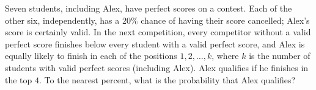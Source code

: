 Seven students, including Alex, have perfect scores on a contest. Each of the other six, independently, has a $20\%$ chance of having their score cancelled; Alex's score is certainly valid. In the next competition, every competitor without a valid perfect score finishes below every student with a valid perfect score, and Alex is equally likely to finish in each of the positions $1,2,\dots,k$, where $k$ is the number of students with valid perfect scores (including Alex). Alex qualifies if he finishes in the top $4$. To the nearest percent, what is the probability that Alex qualifies?
